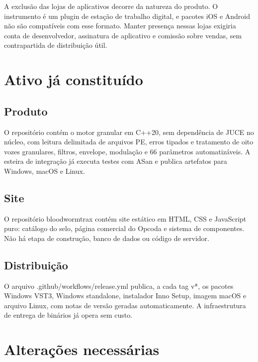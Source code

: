﻿\documentclass[11pt,a4paper]{article}
\begin{document}
A exclusão das lojas de aplicativos decorre da natureza do produto. O instrumento é um plugin de estação de trabalho digital, e pacotes iOS e Android não são compatíveis com esse formato. Manter presença nessas lojas exigiria conta de desenvolvedor, assinatura de aplicativo e comissão sobre vendas, sem contrapartida de distribuição útil.

\section{Ativo já constituído}

\subsection{Produto}

O repositório contém o motor granular em C++20, sem dependência de JUCE no núcleo, com leitura delimitada de arquivos PE, erros tipados e tratamento de oito vozes granulares, filtros, envelope, modulação e 66 parâmetros automatizáveis. A esteira de integração já executa testes com ASan e publica artefatos para Windows, macOS e Linux.

\subsection{Site}

O repositório bloodwormtrax contém site estático em HTML, CSS e JavaScript puro: catálogo do selo, página comercial do Opcoda e sistema de componentes. Não há etapa de construção, banco de dados ou código de servidor.

\subsection{Distribuição}

O arquivo .github/workflows/release.yml publica, a cada tag v*, os pacotes Windows VST3, Windows standalone, instalador Inno Setup, imagem macOS e arquivo Linux, com notas de versão geradas automaticamente. A infraestrutura de entrega de binários já opera sem custo.

\section{Alterações necessárias}
\end{document}
